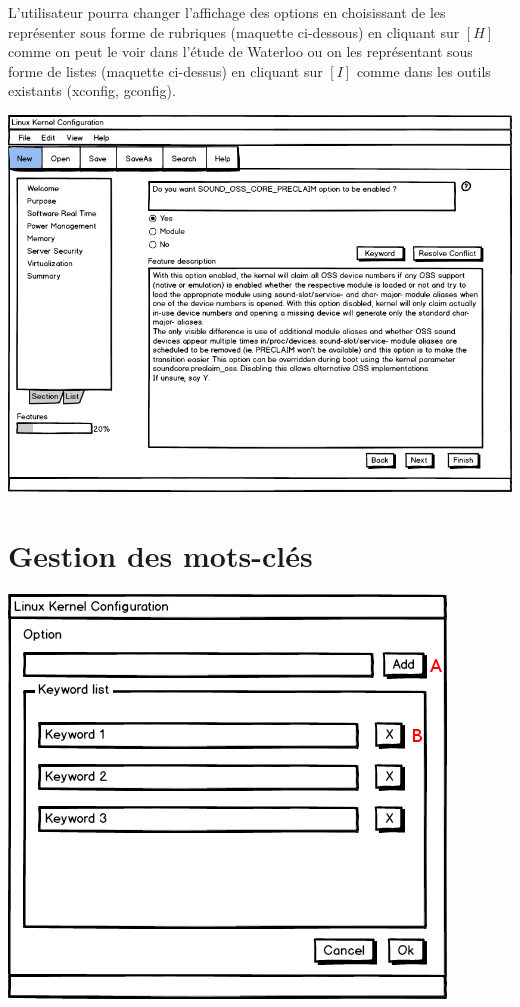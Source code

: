 \documentclass[16pts]{report}
\begin{document}
L'utilisateur pourra changer l'affichage des options en choisissant de les
représenter sous forme de rubriques (maquette ci-dessous) en cliquant sur $[H]$
comme on peut le voir dans l'étude de Waterloo ou on les représentant sous
forme de listes (maquette ci-dessus) en cliquant sur $[I]$ comme dans les
outils existants (xconfig, gconfig).

\includegraphics[scale=0.7]{illustrations/MainWindowSection_an.png} \\


\section{Gestion des mots-clés}
\label{sec:Gestion des mots-clés}
\includegraphics[scale=0.7]{illustrations/keyword_dialog_an.png}
\end{document}
